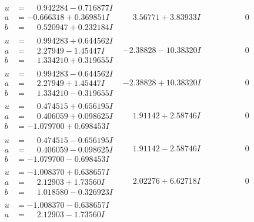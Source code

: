 \documentclass[1p]{elsarticle_modified}
\theoremstyle{definition}
\begin{document}
$$\begin{array}{c|c|c}
 \hline 
\begin{aligned}
u &= \phantom{-}0.942284 - 0.716877 I \\
a &= -0.666318 + 0.369851 I \\
b &= \phantom{-}0.520947 + 0.232184 I\end{aligned}
 & \phantom{-}3.56771 + 3.83933 I & \phantom{-0.000000 } 0 \\ \hline\begin{aligned}
u &= \phantom{-}0.994283 + 0.644562 I \\
a &= \phantom{-}2.27949 - 1.45447 I \\
b &= \phantom{-}1.334210 + 0.319655 I\end{aligned}
 & -2.38828 - 10.38320 I & \phantom{-0.000000 } 0 \\ \hline\begin{aligned}
u &= \phantom{-}0.994283 - 0.644562 I \\
a &= \phantom{-}2.27949 + 1.45447 I \\
b &= \phantom{-}1.334210 - 0.319655 I\end{aligned}
 & -2.38828 + 10.38320 I & \phantom{-0.000000 } 0 \\ \hline\begin{aligned}
u &= \phantom{-}0.474515 + 0.656195 I \\
a &= \phantom{-}0.406059 + 0.098625 I \\
b &= -1.079700 + 0.698453 I\end{aligned}
 & \phantom{-}1.91142 + 2.58746 I & \phantom{-0.000000 } 0 \\ \hline\begin{aligned}
u &= \phantom{-}0.474515 - 0.656195 I \\
a &= \phantom{-}0.406059 - 0.098625 I \\
b &= -1.079700 - 0.698453 I\end{aligned}
 & \phantom{-}1.91142 - 2.58746 I & \phantom{-0.000000 } 0 \\ \hline\begin{aligned}
u &= -1.008370 + 0.638657 I \\
a &= \phantom{-}2.12903 + 1.73560 I \\
b &= \phantom{-}1.018580 - 0.326923 I\end{aligned}
 & \phantom{-}2.02276 + 6.62718 I & \phantom{-0.000000 } 0 \\ \hline\begin{aligned}
u &= -1.008370 - 0.638657 I \\
a &= \phantom{-}2.12903 - 1.73560 I \\

\end{aligned}
\end{array}$$
\end{document}
